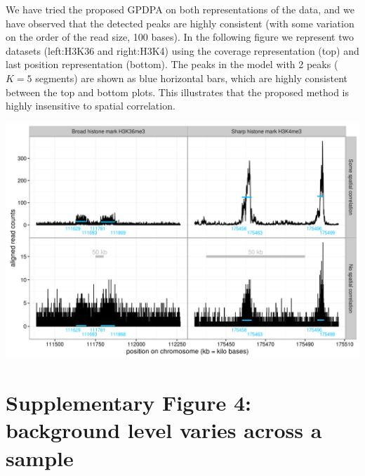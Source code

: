 \documentclass{article}
\begin{document}
We have tried the proposed GPDPA on both representations of the data,
and we have observed that the detected peaks are highly consistent
(with some variation on the order of the read size, 100 bases). In the
following figure we represent two datasets (left:H3K36 and right:H3K4)
using the coverage representation (top) and last position
representation (bottom). The peaks in the model with 2 peaks ($K=5$
segments) are shown as blue horizontal bars, which are highly
consistent between the top and bottom plots. This illustrates that
the proposed method is highly insensitive to spatial correlation.

\includegraphics[width=\textwidth]{figure-spatial-correlation}

\section*{Supplementary Figure 4: background level varies across a sample}
\end{document}
